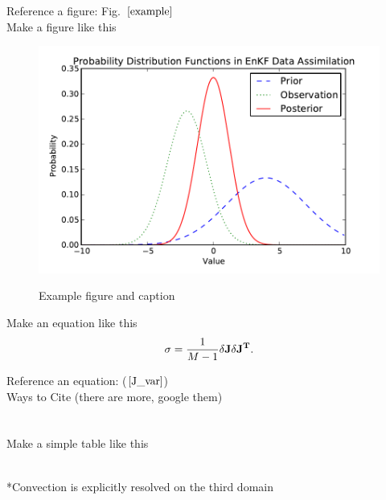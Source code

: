 \documentclass{ttuthes2015}
\newcommand{\tab}{\hspace*{2em}}  %
\begin{document}
\tab Reference a figure: Fig.~$\ref{example}$ \\

\tab Make a figure like this
\begin{figure}[!htb]
  \centering
  \noindent\includegraphics[width=30pc,angle=0]{./example.pdf}\\
  \caption{Example figure and caption}
\label{example2}
\end{figure}

\tab Make an equation like this
\begin{align}\label{J_var}
	\sigma = \frac{1}{M-1} \delta\bf{J} \delta{\mathbf{J}}^T.
\end{align}

\tab Reference an equation: ($\ref{J_var}$) \\
\tab Ways to Cite (there are more, google them) \\
\citep{Ancell2013} \\
\cite{Ancell2013} \\

\tab Make a simple table like this
\begin{table}[!h]   %
\caption{Model Parameterizations Used} 
\centering %
 \\
*Convection is explicitly resolved on the third domain
\label{params} %
\end{table} 
\end{document}
